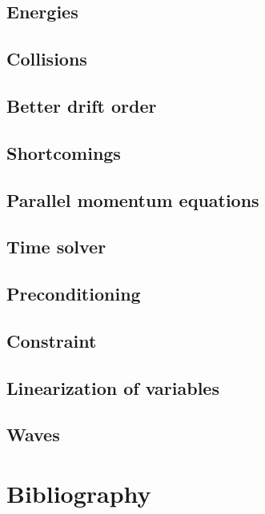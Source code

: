 \documentclass[12pt,a4paper,oneside,openright]{report} %
\begin{document}
\chapter{Energies}
\label{app:energies}


\chapter{Collisions}
\label{app:collisions}


\chapter{Better drift order}
\label{app:betterDO}


\chapter{Shortcomings}
\label{app:shortcomings}


\chapter{Parallel momentum equations}
\label{app:parMom}


\chapter{Time solver}
\label{app:timeSolver}


\chapter{Preconditioning}
\label{app:precon}


\chapter{Constraint}


\chapter{Linearization of variables}
\label{app:linearized}


\chapter{Waves}
\label{app:waves}


\part{Bibliography}


\end{document}
